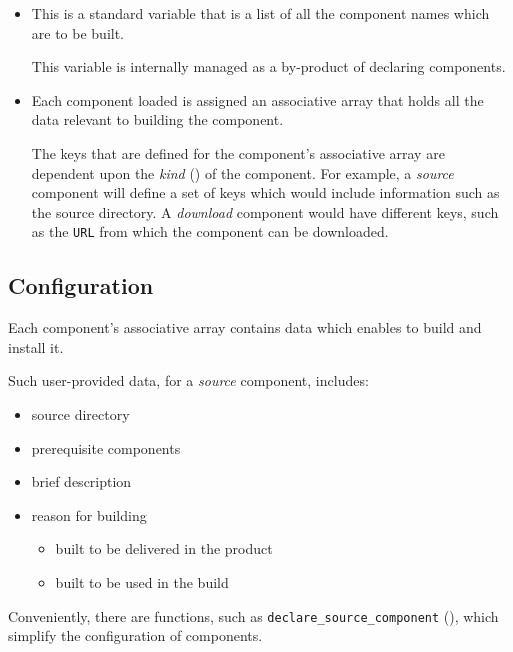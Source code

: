 \begin{itemize}
\item \lmsbwcomponents

  This is a standard \gnumake variable that is a list of all the
  component names which are to be built.

  This variable is internally managed as a by-product of declaring
  components.

\item {}

  Each component loaded is assigned an associative array that holds
  all the data relevant to building the component.

  The keys that are defined for the component's associative array are
  dependent upon the \emph{kind} () of the
  component.  For example, a \emph{source} component will define a set
  of keys which would include information such as the source
  directory.  A \emph{download} component would have different keys,
  such as the \texttt{URL} from which the component can be downloaded.
\end{itemize}


\subsection{ Configuration}

Each component's associative array contains data which enables \lmsbw
to build and install it.

Such user-provided data, for a \emph{source} component, includes:

\begin{itemize}
\item source directory
\item prerequisite components
\item brief description
\item reason for building
  \begin{itemize}
  \item built to be delivered in the product
  \item built to be used in the build
  \end{itemize}
\end{itemize}

Conveniently, there are \lmsbw functions, such as
\texttt{declare\_source\_component}
(), which simplify the
configuration of components.
